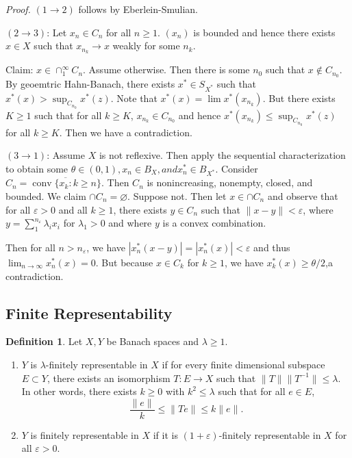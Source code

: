 \documentclass[11pt, reqno]{article}
\theoremstyle{plain}
\theoremstyle{definition}
\newtheorem*{definition}{Definition}
\theoremstyle{remark}
\renewcommand{\epsilon}{\varepsilon}
\renewcommand{\emptyset}{\varnothing}
\begin{document}
\textit{Proof.} $(1 \rightarrow 2)$ follows by Eberlein-Smulian. 

$(2 \rightarrow 3)$: Let $x_n \in C_n$ for all $n \geq 1$. $(x_n)$ is bounded and hence there exists 
$x \in X$ such that $x_{n_k} \rightarrow x$ weakly for some $n_k$. 

Claim: $x \in \cap_1^\infty C_n$. Assume otherwise. Then there is some $n_0$ such that $x \notin C_{n_0}$.
By geoemtric Hahn-Banach, there exists $x^* \in S_{X^*}$ such that $x^*(x) > \sup_{C_{n_0}} x^*(z)$. 
Note that $x^*(x) = \lim x^*(x_{n_k})$. But there exists $K \geq 1$ such that for all $k \geq K$, 
$x_{n_k} \in C_{n_0}$ and hence $x^*(x_{n_k}) \leq \sup_{C_{n_0}} x^*(z)$ for all $k \geq K$. 
Then we have a contradiction.

$(3 \rightarrow 1)$: Assume $X$ is not reflexive. Then apply the sequential characterization
to obtain some $\theta \in (0,1), x_n \in B_X, and x_n^* \in B_{X^*}$. Consider 
$C_n = \overline{\operatorname{conv}\{x_k: k \geq n\}}$. Then $C_n$ is nonincreasing, nonempty,
closed, and bounded. We claim $\cap C_n = \emptyset$. Suppose not. Then let $x \in \cap C_n$ and 
observe that for all $\epsilon > 0$ and all $k \geq 1$, there exists $y \in C_n$ such that 
$\|x - y\| < \epsilon$, where $y = \sum_1^{n_\epsilon} \lambda_i x_i$ for $\lambda_1 > 0$ 
and where $y$ is a convex combination. 

Then for all $n > n_\epsilon$, we have $|x_n^*(x - y)| = |x_n^*(x)| < \epsilon$
and thus $\lim_{n \rightarrow \infty} x_n^*(x) = 0$. But because $x \in C_k$ for 
$k \geq 1$, we have $x_k^*(x) \geq \theta/2$,a contradiction. 

\subsection*{Finite Representability}

\begin{definition}
    Let $X, Y$ be Banach spaces and $\lambda \geq 1$. 
    \begin{enumerate}
        \item $Y$ is $\lambda$-finitely representable in $X$ if for every 
        finite dimensional subspace $E \subset Y$, there exists an isomorphism 
        $T: E \rightarrow X$ such that $\|T\|\|T^{-1}\| \leq \lambda$. In other words,
        there exists $k \geq 0$ with $k^2 \leq \lambda$ such that for all $e \in E$, 
        \[
            \frac{\|e\|}{k} \leq \|Te\| \leq k\|e\|.
        \]

        \item $Y$ is finitely representable in $X$ if it is $(1 + \epsilon)$-finitely representable 
        in $X$ for all $\epsilon > 0$. 
    \end{enumerate}
\end{definition}
\end{document}
